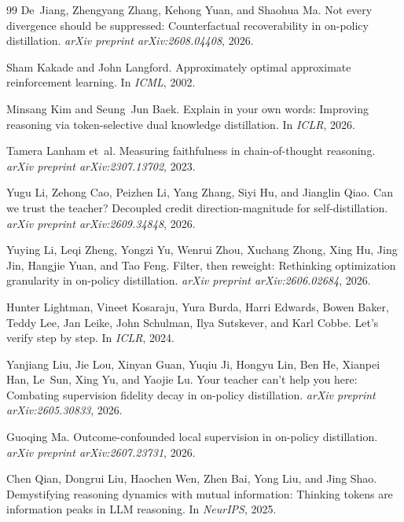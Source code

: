\documentclass[11pt]{article}
\theoremstyle{definition}
\theoremstyle{remark}
\begin{document}
\begin{thebibliography}{99}
De~Jiang, Zhengyang Zhang, Kehong Yuan, and Shaohua Ma.
\newblock Not every divergence should be suppressed: Counterfactual recoverability in on-policy distillation.
\newblock \emph{arXiv preprint arXiv:2608.04408}, 2026.

Sham Kakade and John Langford.
\newblock Approximately optimal approximate reinforcement learning.
\newblock In \emph{ICML}, 2002.

Minsang Kim and Seung~Jun Baek.
\newblock Explain in your own words: Improving reasoning via token-selective dual knowledge distillation.
\newblock In \emph{ICLR}, 2026.

Tamera Lanham et~al.
\newblock Measuring faithfulness in chain-of-thought reasoning.
\newblock \emph{arXiv preprint arXiv:2307.13702}, 2023.

Yugu Li, Zehong Cao, Peizhen Li, Yang Zhang, Siyi Hu, and Jianglin Qiao.
\newblock Can we trust the teacher? {D}ecoupled credit direction-magnitude for self-distillation.
\newblock \emph{arXiv preprint arXiv:2609.34848}, 2026.

Yuying Li, Leqi Zheng, Yongzi Yu, Wenrui Zhou, Xuchang Zhong, Xing Hu, Jing Jin, Hangjie Yuan, and Tao Feng.
\newblock Filter, then reweight: Rethinking optimization granularity in on-policy distillation.
\newblock \emph{arXiv preprint arXiv:2606.02684}, 2026.

Hunter Lightman, Vineet Kosaraju, Yura Burda, Harri Edwards, Bowen Baker, Teddy Lee, Jan Leike, John Schulman, Ilya Sutskever, and Karl Cobbe.
\newblock Let's verify step by step.
\newblock In \emph{ICLR}, 2024.

Yanjiang Liu, Jie Lou, Xinyan Guan, Yuqiu Ji, Hongyu Lin, Ben He, Xianpei Han, Le~Sun, Xing Yu, and Yaojie Lu.
\newblock Your teacher can't help you here: Combating supervision fidelity decay in on-policy distillation.
\newblock \emph{arXiv preprint arXiv:2605.30833}, 2026.

Guoqing Ma.
\newblock Outcome-confounded local supervision in on-policy distillation.
\newblock \emph{arXiv preprint arXiv:2607.23731}, 2026.

Chen Qian, Dongrui Liu, Haochen Wen, Zhen Bai, Yong Liu, and Jing Shao.
\newblock Demystifying reasoning dynamics with mutual information: Thinking tokens are information peaks in {LLM} reasoning.
\newblock In \emph{NeurIPS}, 2025.


\end{thebibliography}
\end{document}
